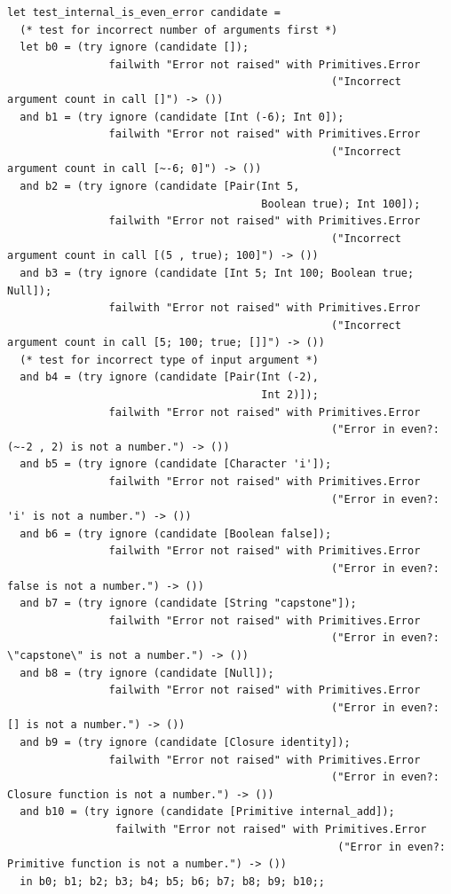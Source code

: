 \begin{tiny}
\begin{verbatim}
let test_internal_is_even_error candidate =
  (* test for incorrect number of arguments first *)
  let b0 = (try ignore (candidate []);
                failwith "Error not raised" with Primitives.Error
                                                   ("Incorrect argument count in call []") -> ())
  and b1 = (try ignore (candidate [Int (-6); Int 0]);
                failwith "Error not raised" with Primitives.Error
                                                   ("Incorrect argument count in call [~-6; 0]") -> ())
  and b2 = (try ignore (candidate [Pair(Int 5,
                                        Boolean true); Int 100]);
                failwith "Error not raised" with Primitives.Error
                                                   ("Incorrect argument count in call [(5 , true); 100]") -> ())
  and b3 = (try ignore (candidate [Int 5; Int 100; Boolean true; Null]);
                failwith "Error not raised" with Primitives.Error
                                                   ("Incorrect argument count in call [5; 100; true; []]") -> ())
  (* test for incorrect type of input argument *)
  and b4 = (try ignore (candidate [Pair(Int (-2),
                                        Int 2)]);
                failwith "Error not raised" with Primitives.Error
                                                   ("Error in even?: (~-2 , 2) is not a number.") -> ())
  and b5 = (try ignore (candidate [Character 'i']);
                failwith "Error not raised" with Primitives.Error
                                                   ("Error in even?: 'i' is not a number.") -> ())
  and b6 = (try ignore (candidate [Boolean false]);
                failwith "Error not raised" with Primitives.Error
                                                   ("Error in even?: false is not a number.") -> ())
  and b7 = (try ignore (candidate [String "capstone"]);
                failwith "Error not raised" with Primitives.Error
                                                   ("Error in even?: \"capstone\" is not a number.") -> ())
  and b8 = (try ignore (candidate [Null]);
                failwith "Error not raised" with Primitives.Error
                                                   ("Error in even?: [] is not a number.") -> ())
  and b9 = (try ignore (candidate [Closure identity]);
                failwith "Error not raised" with Primitives.Error
                                                   ("Error in even?: Closure function is not a number.") -> ())
  and b10 = (try ignore (candidate [Primitive internal_add]);
                 failwith "Error not raised" with Primitives.Error
                                                    ("Error in even?: Primitive function is not a number.") -> ())
  in b0; b1; b2; b3; b4; b5; b6; b7; b8; b9; b10;;
\end{verbatim}
\end{tiny}
